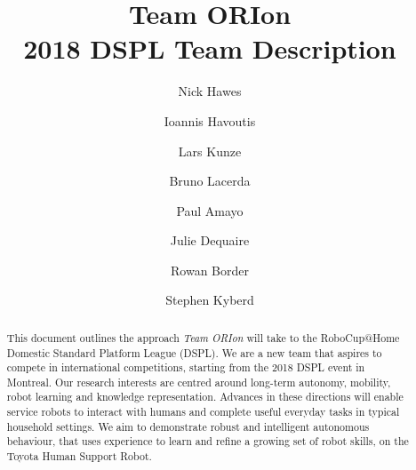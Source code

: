 \documentclass[runningheads,a4paper]{llncs}
\newcommand{\teamori}{Team ORIon}
\begin{document}

\title{\teamori\\ 2018 DSPL Team Description}

\author{Nick Hawes \and Ioannis Havoutis \and Lars Kunze \and Bruno Lacerda \and Paul Amayo \and Julie Dequaire \and Rowan Border \and Stephen Kyberd}
\maketitle



\begin{abstract}
This document outlines the approach \textit{\teamori{}} will take to the 
RoboCup@Home Domestic Standard Platform League (DSPL). 
We are a new team that aspires to compete in international competitions,
starting from the 2018 DSPL event in Montreal. Our research
interests are centred around long-term
autonomy, mobility, robot learning and knowledge representation. 
Advances in these directions will enable service robots to interact with humans
and complete useful everyday tasks in typical household settings. 
We aim to demonstrate robust and intelligent autonomous behaviour, that uses
experience to learn and refine a growing set of robot skills, on the Toyota
Human Support Robot.
\end{abstract}



\end{document}
